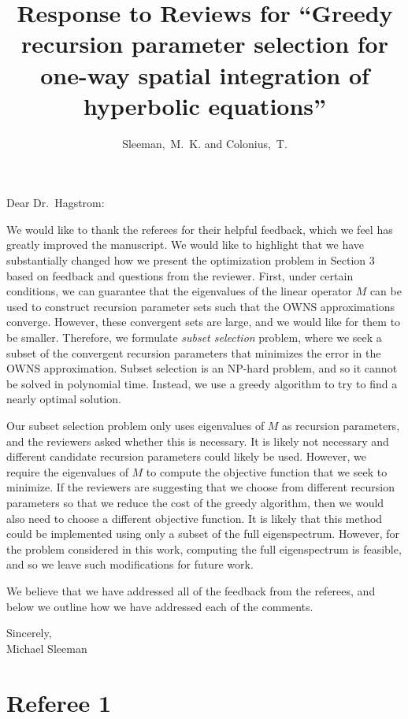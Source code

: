 \documentclass{article}
\title{Response to Reviews for ``Greedy recursion parameter selection for one-way spatial integration of hyperbolic equations''}
\author{Sleeman,~M.~K. and Colonius,~T.}
\date{}
\begin{document}
\maketitle

\begin{flushleft}
Dear Dr.\ Hagstrom:\\
\end{flushleft}
We would like to thank the referees for their helpful feedback, which we feel has greatly improved the manuscript. We would like to highlight that we have substantially changed how we present the optimization problem in Section 3 based on feedback and questions from the reviewer. First, under certain conditions, we can guarantee that the eigenvalues of the linear operator $M$ can be used to construct recursion parameter sets such that the OWNS approximations converge. However, these convergent sets are large, and we would like for them to be smaller. Therefore, we formulate \textit{subset selection} problem, where we seek a subset of the convergent recursion parameters that minimizes the error in the OWNS approximation. Subset selection is an NP-hard problem, and so it cannot be solved in polynomial time. Instead, we use a greedy algorithm to try to find a nearly optimal solution.

Our subset selection problem only uses eigenvalues of $M$ as recursion parameters, and the reviewers asked whether this is necessary. It is likely not necessary and different candidate recursion parameters could likely be used. However, we require the eigenvalues of $M$ to compute the objective function that we seek to minimize. If the reviewers are suggesting that we choose from different recursion parameters so that we reduce the cost of the greedy algorithm, then we would also need to choose a different objective function. It is likely that this method could be implemented using only a subset of the full eigenspectrum. However, for the problem considered in this work, computing the full eigenspectrum is feasible, and so we leave such modifications for future work.

We believe that we have addressed all of the feedback from the referees, and below we outline how we have addressed each of the comments. 

\begin{flushleft}
Sincerely,\\
Michael Sleeman
\end{flushleft}


\pagebreak
\section*{Referee 1}
\end{document}
